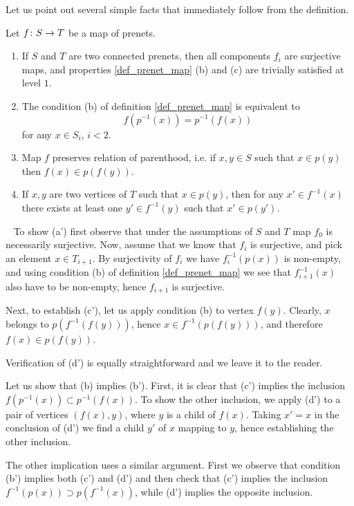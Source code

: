 \documentclass[letterpaper,12pt,leqno]{article}
\numberwithin{equation}{theorem}
\def\proof{\noindent{\em Proof:}\ }
\begin{document}
Let us point out several simple facts that immediately follow from the definition.
\begin{lemma} Let $f\colon S \to T$ be a map of prenets.
\label{lemma_prenet_map}
\begin{enumerate}[label=\alph*')]
\item If $S$ and $T$ are two connected prenets, then all components $f_i$ are surjective maps, and properties \ref{def_prenet_map} (b) and (c) are trivially satisfied at level $1$.
\item The condition (b) of definition \ref{def_prenet_map} is equivalent to
$$
f(p^{-1}(x)) = p^{-1}(f(x))
$$
for any $x \in S_i$, $i < 2$.
\item Map $f$ preserves relation of parenthood, i.e. if $x, y \in S$ such that $x \in p(y)$ then $f(x) \in p(f(y))$.
\item If $x, y$ are two vertices of $T$ such that $x \in p(y)$, then for any $x' \in f^{-1}(x)$ there exists at least one $y' \in f^{-1}(y)$ such that $x' \in p(y')$.
\end{enumerate}
\end{lemma}
\proof
To show (a') first observe that under the assumptions of $S$ and $T$ map $f_0$ is necessarily surjective. Now, assume that we know that $f_i$ is surjective, and pick an element
$x \in T_{i+1}$. By surjectivity of $f_i$ we have $f_i^{-1}(p(x))$ is non-empty, and using condition (b) of definition \ref{def_prenet_map} we see that $f_{i+1}^{-1}(x)$ also
have to be non-empty, hence $f_{i+1}$ is surjective.

Next, to establish (c'), let us apply condition (b) to vertex $f(y)$. Clearly, $x$ belongs to $p(f^{-1}(f(y)))$, hence $x \in f^{-1}(p(f(y)))$, and therefore $f(x) \in p(f(y))$.

Verification of (d') is equally straightforward and we leave it to the reader.

Let us show that (b) implies (b'). First, it is clear that (c') implies the inclusion $f(p^{-1}(x)) \subset p^{-1}(f(x))$. To show the other inclusion, we apply (d') to a pair of vertices
$(f(x), y)$, where $y$ is a child of $f(x)$. Taking $x' = x$ in the conclusion of (d') we find a child $y'$ of $x$ mapping to $y$, hence establishing the other inclusion.

The other implication uses a similar argument. First we observe that condition (b') implies both (c') and (d') and then check that (c') implies the inclusion
$f^{-1}(p(x)) \supset p(f^{-1}(x))$, while (d') implies the opposite inclusion.
\end{document}
